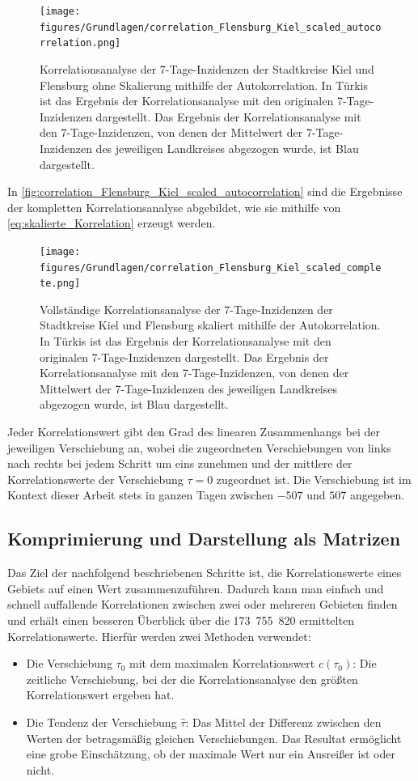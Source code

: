 \begin{figure}[H]
    \centering
    \texttt{[image: figures/Grundlagen/correlation\_Flensburg\_Kiel\_scaled\_autocorrelation.png]}
    \caption{Korrelationsanalyse der 7-Tage-Inzidenzen der Stadtkreise Kiel und Flensburg ohne Skalierung mithilfe der Autokorrelation.
    In Türkis ist das Ergebnis der Korrelationsanalyse mit den originalen 7-Tage-Inzidenzen dargestellt. Das Ergebnis der Korrelationsanalyse mit den 7-Tage-Inzidenzen, von denen der Mittelwert der 7-Tage-Inzidenzen des jeweiligen Landkreises abgezogen wurde, ist Blau dargestellt.}
    \label{fig:correlation_Flensburg_Kiel_scaled_autocorrelation}
\end{figure}
In \autoref{fig:correlation_Flensburg_Kiel_scaled_autocorrelation} sind die Ergebnisse der kompletten Korrelationsanalyse abgebildet, wie sie mithilfe von \autoref{eq:skalierte_Korrelation} erzeugt werden.
\begin{figure}[H]
    \centering
    \texttt{[image: figures/Grundlagen/correlation\_Flensburg\_Kiel\_scaled\_complete.png]}
    \caption{Vollständige Korrelationsanalyse der 7-Tage-Inzidenzen der Stadtkreise Kiel und Flensburg skaliert mithilfe der Autokorrelation.
    In Türkis ist das Ergebnis der Korrelationsanalyse mit den originalen 7-Tage-Inzidenzen dargestellt. Das Ergebnis der Korrelationsanalyse mit den 7-Tage-Inzidenzen, von denen der Mittelwert der 7-Tage-Inzidenzen des jeweiligen Landkreises abgezogen wurde, ist Blau dargestellt.}
    \label{fig:correlation_Flensburg_Kiel_scaled_complete}
\end{figure}

Jeder Korrelationswert gibt den Grad des linearen Zusammenhangs bei der jeweiligen Verschiebung an, wobei die zugeordneten Verschiebungen von links nach rechts bei jedem Schritt um eins zunehmen und der mittlere der Korrelationswerte der Verschiebung $\tau = 0$ zugeordnet ist. Die Verschiebung ist im Kontext dieser Arbeit stets in ganzen Tagen zwischen $-507$ und $507$ angegeben. 

\subsection{Komprimierung und Darstellung als Matrizen}\label{sec:Grundlagen:Korrelation:Komprimierung}
Das Ziel der nachfolgend beschriebenen Schritte ist, die Korrelationswerte eines Gebiets auf einen Wert zusammenzuführen. Dadurch kann man einfach und schnell auffallende Korrelationen zwischen zwei oder mehreren Gebieten finden und erhält einen besseren Überblick über die 173~755~820 ermittelten Korrelationswerte.
Hierfür werden zwei Methoden verwendet:
\begin{itemize}
    \item Die Verschiebung $\tau_0$ mit dem maximalen Korrelationswert $c(\tau_0)$: Die zeitliche Verschiebung, bei der die Korrelationsanalyse den größten Korrelationswert ergeben hat.
    \item Die Tendenz der Verschiebung $\hat{\tau}$: 
    Das Mittel der Differenz zwischen den Werten der betragsmäßig gleichen Verschiebungen.
    Das Resultat ermöglicht eine grobe Einschätzung, ob der maximale Wert nur ein Ausreißer ist oder nicht.
\end{itemize}

